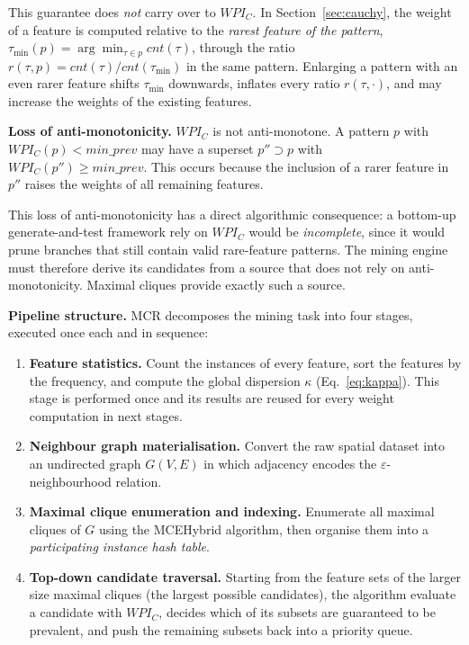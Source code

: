 \documentclass[12pt, letterpaper]{template}
\theoremstyle{definition}
\begin{document}
This guarantee does \emph{not} carry over to $WPI_C$. In Section~\ref{sec:cauchy}, the weight of a feature is computed relative to the
\emph{rarest feature of the pattern}, $\tau_{\min}(p) = \arg\min_{\tau \in p} cnt(\tau)$,
through the ratio $r(\tau,p) = cnt(\tau)/cnt(\tau_{\min})$ in the same pattern. Enlarging a
pattern with an even rarer feature shifts $\tau_{\min}$ downwards, inflates every ratio
$r(\tau,\cdot)$, and may increase the weights of the existing features.

\textbf{Loss of anti-monotonicity.} $WPI_C$ is not anti-monotone. A pattern $p$ with $WPI_C(p) < min\_prev$ may have a superset
$p'' \supset p$ with $WPI_C(p'') \ge min\_prev$. This occurs because the inclusion of a rarer feature
in $p''$ raises the weights of all remaining features.

This loss of anti-monotonicity has a direct algorithmic consequence: a bottom-up
generate-and-test framework  rely on $WPI_C$ would be \emph{incomplete}, since it
would prune branches that still contain valid rare-feature patterns. The mining engine must
therefore derive its candidates from a source that does not rely on anti-monotonicity.
Maximal cliques provide exactly such a source.

\noindent\textbf{Pipeline structure.}
MCR decomposes the mining task into four stages, executed once each and in sequence:

\begin{enumerate}
    \item \textbf{Feature statistics.} Count the instances of every feature, sort the
    features by the frequency, and compute the global dispersion $\kappa$
    (Eq.~\ref{eq:kappa}). This stage is performed once and its
    results are reused for every weight computation in next stages.
    \item \textbf{Neighbour graph materialisation.} Convert the raw spatial dataset into an
    undirected graph $G(V,E)$ in which adjacency encodes the $\varepsilon$-neighbourhood
    relation.
    \item \textbf{Maximal clique enumeration and indexing.} Enumerate all maximal cliques of
    $G$ using the MCEHybrid algorithm, then organise them into a \emph{participating
    instance hash table}.
    \item \textbf{Top-down candidate traversal.} Starting from the feature sets of the larger size
    maximal cliques (the largest possible candidates), the algorithm evaluate a candidate with
    $WPI_C$, decides which of its subsets are guaranteed to be prevalent, and push the
    remaining subsets back into a priority queue.
\end{enumerate}
\end{document}
